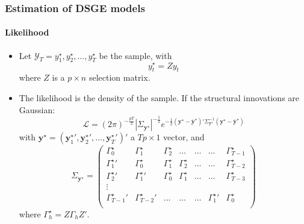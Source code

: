 \documentclass[10pt,slidestop]{beamer}
\begin{document}
\begin{frame}
  \frametitle{Estimation of DSGE models}
  \framesubtitle{Likelihood}
  \begin{itemize}
    \item Let $\mathcal Y_T =
      {y_1^{\star},y_2^{\star},\dots,y_T^{\star}}$ be the sample, with
      \[
      y_t^{\star} = Z y_t
      \]
      where $Z$ is a $p\times n$ selection matrix.
      \bigskip
    \item The likelihood is the density of the sample. If the
      structural innovations are Gaussian:
      \[
      \mathcal L = (2\pi)^{-\frac{pT}{2}}|\Sigma_{\mathbf
        y^{\star}}|^{-\frac{1}{2}}e^{-\frac{1}{2}(\mathbf y^{\star}-\bar{\mathbf y}^{\star})'\Sigma_{\mathbf
        y^{\star}}^{-1}(\mathbf y^{\star}-\bar{\mathbf y}^{\star})}
      \]
      with $\mathbf y^{\star} = (\left.\mathbf
        y_1^{\star}\right.',\left.\mathbf
        y_2^{\star}\right.',\dots,\left.\mathbf y_T^{\star}\right.')'$
      a $Tp\times 1$ vector, and
      \[
      \Sigma_{\mathbf y^{\star}} =
      \begin{pmatrix}
        \Gamma_0^{\star}  & \Gamma_1^{\star}  & \Gamma_2^{\star} &  \dots   & \dots & \dots & \Gamma_{T-1}^{\star}\\
        {\Gamma_1^{\star}}' & \Gamma_0^{\star}  & \Gamma_1^{\star} & \Gamma_2^{\star} & \dots & \dots & \Gamma_{T-2}^{\star}\\
        {\Gamma_2^{\star}}' & {\Gamma_1^{\star}}' & \Gamma_0^{\star} & \Gamma_1^{\star} & \dots & \dots & \Gamma_{T-3}^{\star}\\
        \vdots    &           &         &           &      &        & \\
        {\Gamma_{T-1}^{\star}}' & {\Gamma_{T-2}^{\star}}' & \dots & \dots & \dots & {\Gamma_1^{\star}}' & \Gamma_{0}^{\star}\\
      \end{pmatrix}
      \]
      where $\Gamma_h^{\star} = Z\Gamma_hZ'$.
  \end{itemize}

\end{frame}
\end{document}
